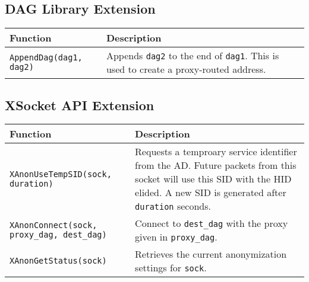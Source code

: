 \documentclass[11pt]{article}
\begin{document}
\subsection{DAG Library Extension}

\begin{center}
	\begin{tabular}{l p{7cm}}
	\textbf{Function} 	&	\textbf{Description}\\
	\hline
	\texttt{AppendDag(dag1, dag2)} & Appends \texttt{dag2} to the end of \texttt{dag1}.  This is used to create a proxy-routed address. \\ \hline
	\end{tabular}
\end{center}

\subsection{XSocket API Extension}
\label{sec:api-interface}

\begin{center}
	\begin{tabular}{l p{7cm}}
	\textbf{Function} 	&	\textbf{Description}\\
	\hline
	\texttt{XAnonUseTempSID(sock, duration)} & Requests a temproary service identifier from the AD.  Future packets from this socket will use this SID with the HID elided. A new SID is generated after \texttt{duration} seconds. \\
	\texttt{XAnonConnect(sock, proxy\_dag, dest\_dag)} & Connect to \texttt{dest\_dag} with the proxy given in \texttt{proxy\_dag}.\\
	\texttt{XAnonGetStatus(sock)} & Retrieves the current anonymization settings for \texttt{sock}.\\
	\hline
	\end{tabular}
\end{center}
\end{document}
